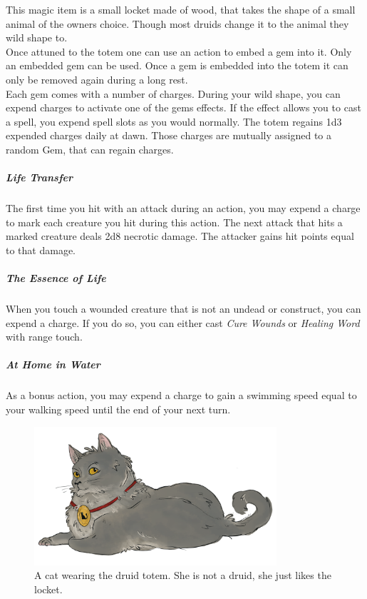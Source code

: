 \documentclass[letter,10pt,twocolumn,openany]{dndbook}
\begin{document}

This magic item is a small locket made of wood, that takes the shape of a small animal of the owners choice.
Though most druids change it to the animal they wild shape to.\\

Once attuned to the totem one can use an action to embed a gem into it.
Only an embedded gem can be used.
Once a gem is embedded into the totem it can only be removed again during a long rest.\\

Each gem comes with a number of charges.
During your wild shape, you can expend charges to activate one of the gems effects.
If the effect allows you to cast a spell, you expend spell slots as you would normally.
The totem regains 1d3 expended charges daily at dawn.
Those charges are mutually assigned to a random Gem, that can regain charges.


\subparagraph{Life Transfer}
The first time you hit with an attack during an action, you may expend a charge to mark each creature you hit during this action.
The next attack that hits a marked creature deals 2d8 necrotic damage.
The attacker gains hit points equal to that damage.

\subparagraph{The Essence of Life}
When you touch a wounded creature that is not an undead or construct, you can expend a charge.
If you do so, you can either cast \textit{Cure Wounds} or \textit{Healing Word} with range touch.

\subparagraph{At Home in Water}
As a bonus action, you may expend a charge to gain a swimming speed equal to your walking speed until the end of your next turn.

\begin{figure}
    \includegraphics[width=9cm]{images/cat.png}
    \caption{A cat wearing the druid totem. She is not a druid, she just likes the locket.}
\end{figure}
\end{document}
